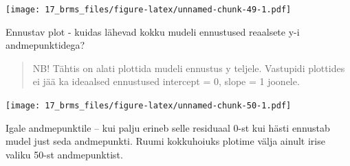 \documentclass[]{book}
\newenvironment{Shaded}{\begin{snugshade}}{\end{snugshade}}
\newcommand{\DataTypeTok}[1]{\textcolor[rgb]{0.13,0.29,0.53}{#1}}
\newcommand{\DecValTok}[1]{\textcolor[rgb]{0.00,0.00,0.81}{#1}}
\newcommand{\FloatTok}[1]{\textcolor[rgb]{0.00,0.00,0.81}{#1}}
\newcommand{\KeywordTok}[1]{\textcolor[rgb]{0.13,0.29,0.53}{\textbf{#1}}}
\newcommand{\NormalTok}[1]{#1}
\newcommand{\OperatorTok}[1]{\textcolor[rgb]{0.81,0.36,0.00}{\textbf{#1}}}
\newcommand{\StringTok}[1]{\textcolor[rgb]{0.31,0.60,0.02}{#1}}
\begin{document}
\texttt{[image: 17\_brms\_files/figure-latex/unnamed-chunk-49-1.pdf]}

Ennustav plot - kuidas lähevad kokku mudeli ennustused reaalsete y-i andmepunktidega?

\begin{quote}
NB! Tähtis on alati plottida mudeli ennustus y teljele. Vastupidi plottides ei jää ka ideaalsed ennustused intercept = 0, slope = 1 joonele.
\end{quote}

\begin{Shaded}
\end{Shaded}

\texttt{[image: 17\_brms\_files/figure-latex/unnamed-chunk-50-1.pdf]}

Igale andmepunktile -- kui palju erineb selle residuaal 0-st kui hästi ennustab mudel just seda andmepunkti. Ruumi kokkuhoiuks plotime välja ainult irise valiku 50-st andmepunktist.
\end{document}
